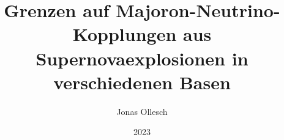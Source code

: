 \documentclass[
  tucolor,       %
  BCOR=12mm,     %
  parskip=half,  %
  open=any,      %
  cleardoublepage=plain,  %
]{tudothesis}
\author{Jonas Ollesch}
\title{Grenzen auf Majoron-Neutrino-Kopplungen aus Supernovaexplosionen in verschiedenen Basen}
\date{2023}
\begin{document}
\frontmatter
\maketitle

\makecorrectorpage


\tableofcontents

\mainmatter







\appendix


\backmatter
\printbibliography

\cleardoublepage

\end{document}
